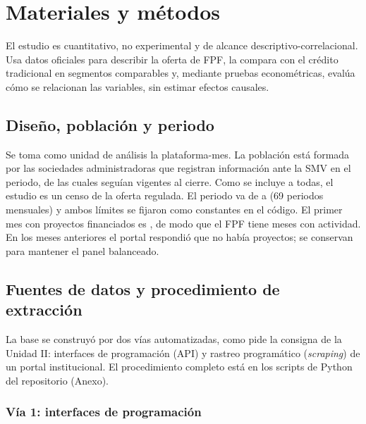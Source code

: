 \section{Materiales y métodos}

El estudio es cuantitativo, no experimental y de alcance descriptivo-correlacional. Usa datos oficiales para describir la oferta de FPF, la compara con el crédito tradicional en segmentos comparables y, mediante pruebas econométricas, evalúa cómo se relacionan las variables, sin estimar efectos causales.

\subsection{Diseño, población y periodo}

Se toma como unidad de análisis la plataforma-mes. La población está formada por las  sociedades administradoras que registran información ante la SMV en el periodo, de las cuales  seguían vigentes al cierre. Como se incluye a todas, el estudio es un censo de la oferta regulada. El periodo va de  a  (69 periodos mensuales) y ambos límites se fijaron como constantes en el código. El primer mes con proyectos financiados es , de modo que el FPF tiene  meses con actividad. En los meses anteriores el portal respondió que no había proyectos; se conservan para mantener el panel balanceado.

\subsection{Fuentes de datos y procedimiento de extracción}

La base se construyó por dos vías automatizadas, como pide la consigna de la Unidad II: interfaces de programación (API) y rastreo programático (\textit{scraping}) de un portal institucional. El procedimiento completo está en los scripts de Python del repositorio (Anexo).

\subsubsection{Vía 1: interfaces de programación}

